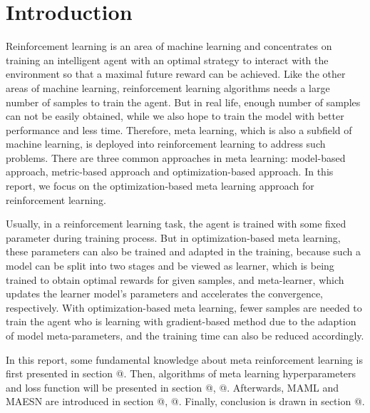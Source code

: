 \documentclass[conference]{IEEEtran}
\makeatletter
\newcommand*{\rom}[1]{\expandafter\@slowromancap\romannumeral #1@}
\makeatother
\begin{document}
	\section{Introduction}
	Reinforcement learning is an area of machine learning and concentrates on training an intelligent agent with an optimal strategy to interact with the environment so that a maximal future reward can be achieved. Like the other areas of machine learning, reinforcement learning algorithms needs a large number of samples to train the agent. But in real life, enough number of samples can not be easily obtained, while we also hope to train the model with better performance and less time. Therefore, meta learning, which is also a subfield of machine learning, is deployed into reinforcement learning to address such problems. There are three common approaches in meta learning: model-based approach, metric-based approach and optimization-based approach. In this report, we focus on the optimization-based meta learning approach for reinforcement learning.
	\par
	Usually, in a reinforcement learning task, the agent is trained with some fixed parameter during training process. But in optimization-based meta learning, these parameters can also be trained and adapted in the training, because such a model can be split into two stages and be viewed as learner, which is being trained to obtain optimal rewards for given samples, and meta-learner, which updates the learner model's parameters and accelerates the convergence, respectively. With optimization-based meta learning, fewer samples are needed to train the agent who is learning with gradient-based method due to the adaption of model meta-parameters, and the training time can also be reduced accordingly.
	\par
	In this report, some fundamental knowledge about meta reinforcement learning is first presented in section \rom{2}. Then, algorithms of meta learning hyperparameters and loss function will be presented in section \rom{3}, \rom{4}. Afterwards, MAML and MAESN are introduced in section \rom{5}, \rom{6}. Finally, conclusion is drawn in section \rom{7}.
	
	
	
	
	
	
\end{document}
